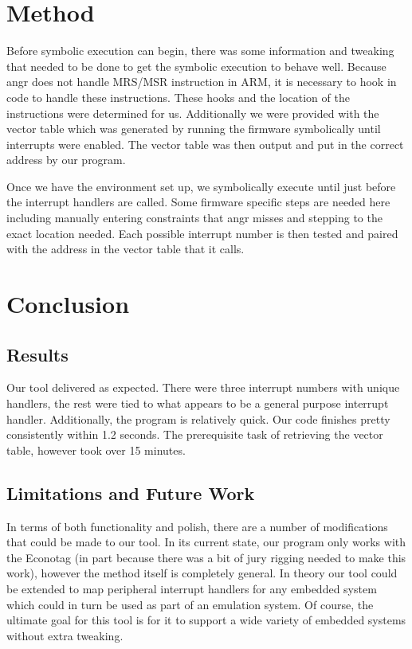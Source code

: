\documentclass[letterpaper, 10 pt, conference]{ieeeconf}
\begin{document}
\section{Method}
Before symbolic execution can begin, there was some information and tweaking that needed to be done to get the symbolic execution to behave well. Because angr does not handle MRS/MSR instruction in ARM, it is necessary to hook in code to handle these instructions. These hooks and the location of the instructions were determined for us. Additionally we were provided with the vector table which was generated by running the firmware symbolically until interrupts were enabled. %
The vector table was then output and put in the correct address by our program. 

Once we have the environment set up, we symbolically execute until just before the interrupt handlers are called. Some firmware specific steps are needed here including manually entering constraints that angr misses and stepping to the exact location needed. Each possible interrupt number is then tested and paired with the address in the vector table that it calls.

\section{Conclusion}
\subsection{Results} %
Our tool delivered as expected. There were three interrupt numbers with unique handlers, the rest were tied to what appears to be a general purpose interrupt handler. Additionally, the program is relatively quick. Our code finishes pretty consistently within 1.2 seconds. The prerequisite task of retrieving the vector table, however took over 15 minutes. 

\subsection{Limitations and Future Work}
In terms of both functionality and polish, there are a number of modifications that could be made to our tool. In its current state, our program only works with the Econotag (in part because there was a bit of jury rigging needed to make this work), however the method itself is completely general. In theory our tool could be extended to map peripheral interrupt handlers for any embedded system which could in turn be used as part of an emulation system. Of course, the ultimate goal for this tool is for it to support a wide variety of embedded systems without extra tweaking. 
\end{document}
